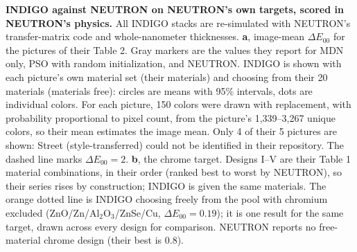 \caption{\textbf{INDIGO against NEUTRON on NEUTRON's own targets, scored in NEUTRON's physics.} All INDIGO stacks are re-simulated with NEUTRON's transfer-matrix code and whole-nanometer thicknesses. \textbf{a}, image-mean $\Delta E_{00}$ for the pictures of their Table 2. Gray markers are the values they report for MDN only, PSO with random initialization, and NEUTRON. INDIGO is shown with each picture's own material set (their materials) and choosing from their 20 materials (materials free): circles are means with 95\% intervals, dots are individual colors. For each picture, 150 colors were drawn with replacement, with probability proportional to pixel count, from the picture's 1,339--3,267 unique colors, so their mean estimates the image mean. Only 4 of their 5 pictures are shown: Street (style-transferred) could not be identified in their repository. The dashed line marks $\Delta E_{00} = 2$. \textbf{b}, the chrome target. Designs I--V are their Table 1 material combinations, in their order (ranked best to worst by NEUTRON), so their series rises by construction; INDIGO is given the same materials. The orange dotted line is INDIGO choosing freely from the pool with chromium excluded (ZnO/Zn/Al$_{2}$O$_{3}$/ZnSe/Cu, $\Delta E_{00} = 0.19$); it is one result for the same target, drawn across every design for comparison. NEUTRON reports no free-material chrome design (their best is 0.8).}

